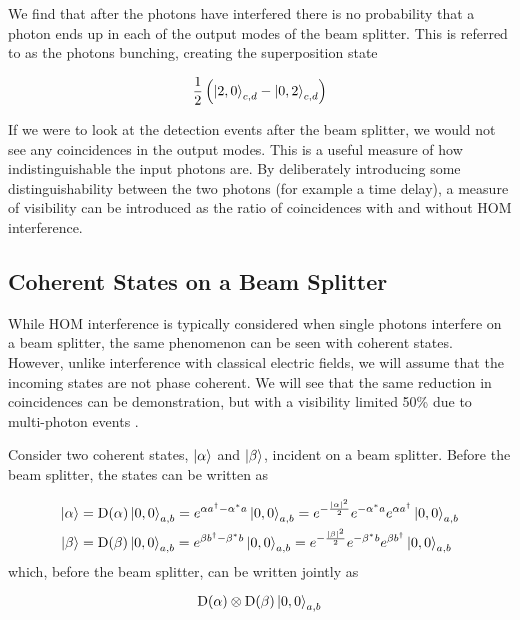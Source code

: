 We find that after the photons have interfered there is no probability that a photon ends up in each of the output modes of the beam splitter. This is referred to as the photons bunching, creating the superposition state

\begin{equation}
	\frac{1}{2}\left(\ket{2,0}_{c,d} - \ket{0,2}_{c,d}\right)
\end{equation}

If we were to look at the detection events after the beam splitter, we would not see any coincidences in the output modes. This is a useful measure of how indistinguishable the input photons are. By deliberately introducing some distinguishability between the two photons (for example a time delay), a measure of visibility can be introduced as the ratio of coincidences with and without \ac{HOM} interference.

\subsection{Coherent States on a Beam Splitter}

While \ac{HOM} interference is typically considered when single photons interfere on a beam splitter, the same phenomenon can be seen with coherent states.  However, unlike interference with classical electric fields, we will assume that the incoming states are not phase coherent. We will see that the same reduction in coincidences can be demonstration, but with a visibility limited 50\% due to multi-photon events \cite{Rarity2005}. 

Consider two coherent states, $\ket{\alpha}$ and $\ket{\beta}$, incident on a beam splitter. Before the beam splitter, the states can be written as

\begin{align}
	\ket{\alpha} &= \text{D}(\alpha)\ket{0,0}_{a,b} = e^{\alpha a^\dagger - \alpha^\ast a}\ket{0,0}_{a,b} = e^{-\frac{|\alpha|^2}{2}} e^{-\alpha^\ast a} e^{\alpha a^\dagger}\ket{0,0}_{a,b}\\
	\ket{\beta} &= \text{D}(\beta)\ket{0,0}_{a,b} = e^{\beta b^\dagger - \beta^\ast b}\ket{0,0}_{a,b} = e^{-\frac{|\beta|^2}{2}} e^{-\beta^\ast b} e^{\beta b^\dagger}\ket{0,0}_{a,b}
\end{align}
which, before the beam splitter, can be written jointly as

\begin{equation}
	\text{D}(\alpha)\otimes\text{D}(\beta)\ket{0,0}_{a,b}
\end{equation}

